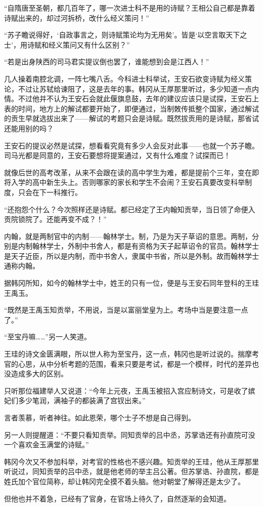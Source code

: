 “自隋唐至圣朝，都几百年了，哪一次进士科不是用的诗赋？王相公自己都是靠着诗赋出来的，却过河拆桥，改什么经义策问！”

“苏子瞻说得好，‘自政事言之，则诗赋策论均为无用矣’。皆是‘以空言取天下之士’，用诗赋和经义策问又有什么区别？”

“若是出身陕西的司马君实提议倒也罢了，谁能想到会是江西人！”

几人操着南腔北调，一阵七嘴八舌。今科进士科举试，王安石欲变诗赋为经义策论，不过让苏轼给谏阻了，这是去年的事。韩冈从王厚那里听过，多少知道一点内情。不过他并不认为王安石会就此偃旗息鼓，去年的建议应该只是试探，王安石上表的时间，地方上的解试都要开始了，即便通过，当制敇传抵整个国家，通过解试的贡生早就选拔出来了——解试的考题只会是诗赋。既然拔贡用的是诗赋，那省试还能用别的吗？

王安石的提议必然是试探，想看看究竟有多少人会反对此事——也就一个苏子瞻。司马光都是同意的，王安石要想将提案通过，又有什么难度？试探而已！

就像后世的高考改革，从来不会跟在读的高中学生为难，都是提前个三年，变在即将入学的高中新生头上。否则哪家的家长和学生不会闹？王安石真要改变科举制度，只会在下一科推行。

“还抱怨个什么？今次照样还是诗赋。都已经定了王内翰知贡举，当日领了命便入贡院锁院了。还能再变不成？！”

内翰，就是两制官中的内制——翰林学士。制，乃是为天子草诏的意思。两制，分别是内制翰林学士，外制中书舍人，都是有资格为天子起草诏令的官员。翰林学士是天子近臣，所以是内制，而中书舍人，隶属中书省，所以是外制。故而翰林学士通称内翰。

据韩冈所知，如今的翰林学士中，姓王的只有一位，便是与王安石同年登科的王珪王禹玉。

“既然是王禹玉知贡举，不用说，当是以富丽堂皇为上。考场中当是要注意一点了。”

“至宝丹嘛……”另一人笑道。

王珪的诗文金匮满眼，所以世人称为至宝丹，这一点，韩冈也是听过说的。揣摩考官的心思，从中分析考题的范围，看来只要是考试，都是一个模样，时代的差异也没造成多大的区别。

只听那位福建举人又说道：“今年上元夜，王禹玉被招入宫应制诗文，可是收了嫔妃们多少笔润，满袖子的都装满了宫钗出来。”

言者羡慕，听者神往。如此恩荣，哪个士子不想是自己得到。

另一人则提醒道：“不要只看知贡举。同知贡举的吕中丞，苏掌诰还有孙直院可没一个喜欢金玉满堂的诗赋。”

韩冈今次又不参加科举，对考官的性格也不感兴趣。知贡举的王珪，他从王厚那里听说过，同知贡举的吕中丞，就是他老师的举主吕公著。但苏掌诰、孙直院，都是姓氏加个官位简称，却让韩冈完全摸不着头脑。他对朝堂了解得还是太少了。

但他也并不着急，已经有了官身，在官场上待久了，自然逐渐的会知道。

